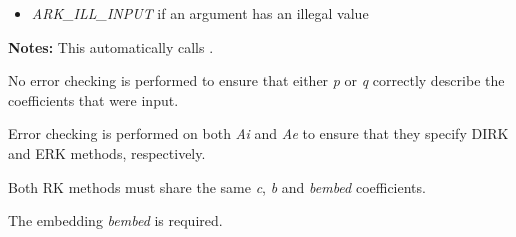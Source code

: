 \documentclass[letterpaper,10pt,english]{sphinxmanual}
\begin{document}
\begin{fulllineitems}
\begin{description}
\begin{itemize}
\item {} 
\emph{ARK\_ILL\_INPUT} if an argument has an illegal value

\end{itemize}

\end{description}

\textbf{Notes:} This automatically calls {\hyperref[c_interface/User_callable:ARKodeSetImEx]{}}.

No error checking is performed to ensure that either \emph{p} or \emph{q}
correctly describe the coefficients that were input.

Error checking is performed on both \emph{Ai} and \emph{Ae} to ensure
that they specify DIRK and ERK methods, respectively.

Both RK methods must share the same \emph{c}, \emph{b} and \emph{bembed} coefficients.

The embedding \emph{bembed} is required.

\end{fulllineitems}

\end{document}
